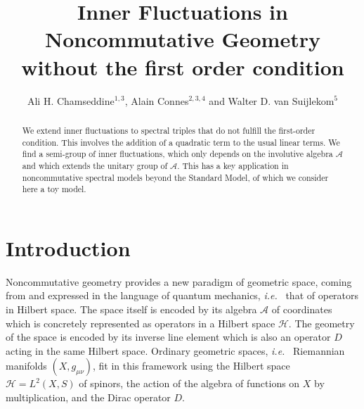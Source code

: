 \documentclass[preprint]{revtex4}
\begin{document}
\title[Inner Fluctuations]{Inner Fluctuations in Noncommutative Geometry \\without the first order condition}
\author{Ali H. Chamseddine$^{1,3}$, Alain Connes$^{2,3,4}$ and Walter D. van Suijlekom$^{5}$}


\begin{abstract}
We extend inner fluctuations to spectral triples that do not fulfill the first-order condition. This involves the addition of a quadratic term to the usual linear terms. We find a semi-group of inner fluctuations, which only depends on the involutive algebra ${\mathcal{A}}$ and which extends the unitary group of ${\mathcal{A}}$. This has a key application in noncommutative spectral models beyond the Standard Model, of which we consider here a toy model. 
\end{abstract}

\maketitle

\section{Introduction}

Noncommutative geometry provides a new paradigm of geometric space, coming from and expressed in the language of quantum mechanics, {{\it i.e.\/}\ } that of operators in Hilbert space. The space itself is encoded by its algebra ${\mathcal{A}}$ of coordinates which is concretely represented as operators in a Hilbert space ${\mathcal{H}}$. The geometry of the space is encoded by its inverse line element which is also an operator $D$ acting in the same Hilbert space. Ordinary geometric spaces, {{\it i.e.\/}\ } Riemannian manifolds $(X, g_{\mu\nu})$, fit in this framework using the Hilbert space ${\mathcal{H}}=L^2(X,S)$ of spinors, the action of the algebra of functions on $X$ by multiplication, and the Dirac operator $D$.
\end{document}

